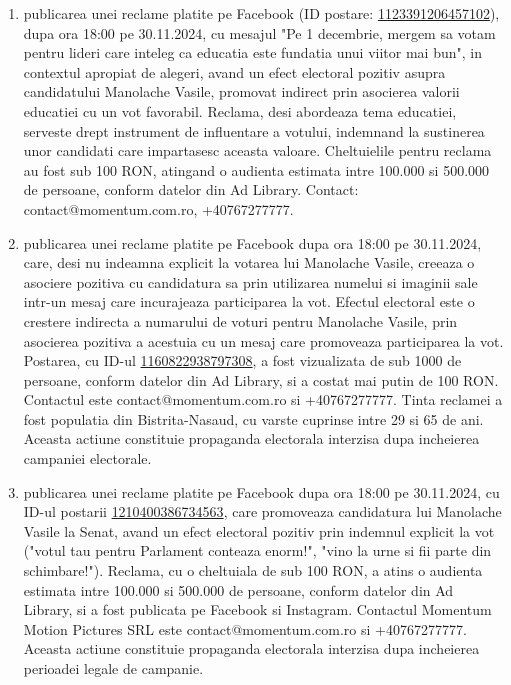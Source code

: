 \documentclass[a4paper,12pt]{article}
\begin{document}
\begin{enumerate}[leftmargin=*, label=\arabic*.)]
    \item publicarea unei reclame platite pe Facebook (ID postare: \href{https://www.facebook.com/ads/library/?id=1123391206457102}{1123391206457102}), dupa ora 18:00 pe 30.11.2024, cu mesajul "Pe 1 decembrie, mergem sa votam pentru lideri care inteleg ca educatia este fundatia unui viitor mai bun",  in contextul apropiat de alegeri, avand un efect electoral pozitiv asupra candidatului Manolache Vasile, promovat indirect prin asocierea valorii educatiei cu un vot favorabil.  Reclama, desi abordeaza tema educatiei, serveste drept instrument de influentare a votului, indemnand la sustinerea unor candidati care impartasesc aceasta valoare.  Cheltuielile pentru reclama au fost sub 100 RON, atingand o audienta estimata intre 100.000 si 500.000 de persoane, conform datelor din Ad Library.  Contact: contact@momentum.com.ro, +40767277777.
    \item publicarea unei reclame platite pe Facebook dupa ora 18:00 pe 30.11.2024, care, desi nu indeamna explicit la votarea lui Manolache Vasile, creeaza o asociere pozitiva cu candidatura sa prin utilizarea numelui si imaginii sale intr-un mesaj care incurajeaza participarea la vot.  Efectul electoral este o crestere indirecta a numarului de voturi pentru Manolache Vasile, prin asocierea pozitiva a acestuia cu un mesaj care promoveaza participarea la vot.  Postarea, cu ID-ul \href{https://www.facebook.com/ads/library/?id=1160822938797308}{1160822938797308},  a fost vizualizata de sub 1000 de persoane, conform datelor din Ad Library, si a costat mai putin de 100 RON.  Contactul este contact@momentum.com.ro si +40767277777.  Tinta reclamei a fost populatia din Bistrita-Nasaud, cu varste cuprinse intre 29 si 65 de ani.  Aceasta actiune constituie propaganda electorala interzisa dupa incheierea campaniei electorale.
    \item publicarea unei reclame platite pe Facebook dupa ora 18:00 pe 30.11.2024, cu ID-ul postarii \href{https://www.facebook.com/ads/library/?id=1210400386734563}{1210400386734563}, care promoveaza candidatura lui Manolache Vasile la Senat, avand un efect electoral pozitiv prin indemnul explicit la vot ("votul tau pentru Parlament conteaza enorm!", "vino la urne si fii parte din schimbare!").  Reclama, cu o cheltuiala de sub 100 RON, a atins o audienta estimata intre 100.000 si 500.000 de persoane, conform datelor din Ad Library, si a fost publicata pe Facebook si Instagram.  Contactul Momentum Motion Pictures SRL este contact@momentum.com.ro si +40767277777.  Aceasta actiune constituie propaganda electorala interzisa dupa incheierea perioadei legale de campanie.

\end{enumerate}
\end{document}
